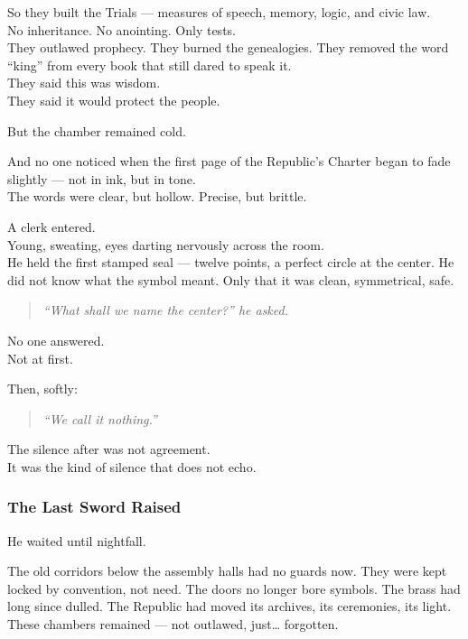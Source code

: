 \documentclass[12pt]{article}
\begin{document}
So they built the Trials --- measures of speech, memory, logic, and civic law.\\
No inheritance. No anointing. Only tests.\\

They outlawed prophecy. 
They burned the genealogies.
They removed the word “king” from every book that still dared to speak it.\\

They said this was wisdom.\\
They said it would protect the people.

But the chamber remained cold.

And no one noticed when the first page of the Republic’s Charter began to fade slightly --- not in ink, but in tone.\\
The words were clear, but hollow. Precise, but brittle.

\vspace{1em}

A clerk entered.\\
Young, sweating, eyes darting nervously across the room.\\
He held the first stamped seal --- twelve points, a perfect circle at the center. He did not know what the symbol meant. Only that it was clean, symmetrical, safe.

\begin{quote}
\textit{“What shall we name the center?” he asked.}
\end{quote}

No one answered.\\
Not at first.

Then, softly:

\begin{quote}
\textit{“We call it nothing.”}
\end{quote}

The silence after was not agreement.\\
It was the kind of silence that does not echo.

\dotfill

\subsubsection*{The Last Sword Raised}

He waited until nightfall.

The old corridors below the assembly halls had no guards now. They were kept locked by convention, not need. The doors no longer bore symbols. The brass had long since dulled. The Republic had moved its archives, its ceremonies, its light. These chambers remained --- not outlawed, just… forgotten.
\end{document}
